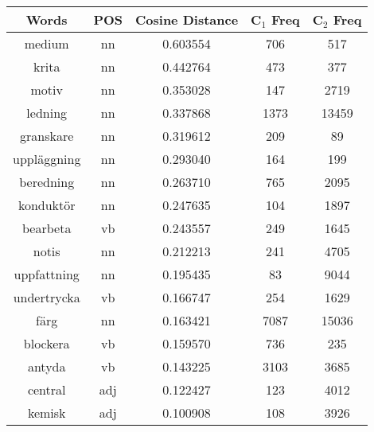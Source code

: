 \begin{table}
\centering
\begin{tabular}{ccccc} 
\toprule
\textbf{ Words } & \textbf{ POS } & \textbf{ Cosine Distance } & \textbf{ C$_1$ Freq } & \textbf{ C$_2$ Freq }  \\ 
\midrule
medium           & nn            & 0.603554           & 706                & 517                 \\
krita            & nn            & 0.442764           & 473                & 377                 \\
motiv            & nn            & 0.353028           & 147                & 2719                \\
ledning          & nn            & 0.337868           & 1373               & 13459               \\
granskare        & nn            & 0.319612           & 209                & 89                  \\
uppläggning      & nn            & 0.293040           & 164                & 199                 \\
beredning        & nn            & 0.263710           & 765                & 2095                \\
konduktör        & nn            & 0.247635           & 104                & 1897                \\
bearbeta         & vb            & 0.243557           & 249                & 1645                \\
notis            & nn            & 0.212213           & 241                & 4705                \\
uppfattning      & nn            & 0.195435           & 83                 & 9044                \\
undertrycka      & vb            & 0.166747           & 254                & 1629                \\
färg             & nn            & 0.163421           & 7087               & 15036               \\
blockera         & vb            & 0.159570           & 736                & 235                 \\
antyda           & vb            & 0.143225           & 3103               & 3685                \\
central          & adj           & 0.122427           & 123                & 4012                \\
kemisk           & adj           & 0.100908           & 108                & 3926                \\

\end{tabular}
\end{table}
